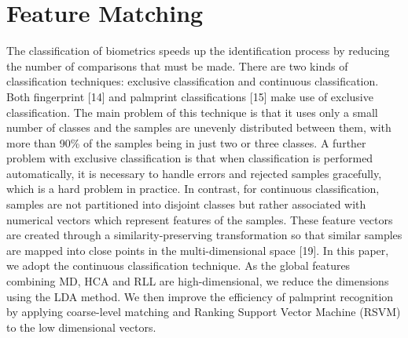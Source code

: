 \section{Feature Matching}
\label{sec:methodology:featurematch}

The classification of biometrics speeds up the identification process by reducing the number of comparisons that must be made. There are two kinds of classification techniques: exclusive classification and continuous classification. Both fingerprint [14] and palmprint classifications [15] make use of exclusive classification. The main problem of this technique is that it uses only a small number of classes and the samples are unevenly distributed between them, with more than 90\% of the samples being in just two or three classes. A further problem with exclusive classification is that when classification is performed automatically, it is necessary to handle errors and rejected samples gracefully, which is a hard problem in practice. In contrast, for continuous classification, samples are not partitioned into disjoint classes but rather associated with numerical vectors which represent features of the samples. These feature vectors are created through a similarity-preserving transformation so that similar samples are mapped into close points in the multi-dimensional space [19]. In this paper, we adopt the continuous classification technique. As the global features combining MD, HCA and RLL are high-dimensional, we reduce the dimensions using the LDA method. We then improve the efficiency of palmprint recognition by applying coarse-level matching and Ranking Support Vector Machine (RSVM) to the low dimensional vectors.



